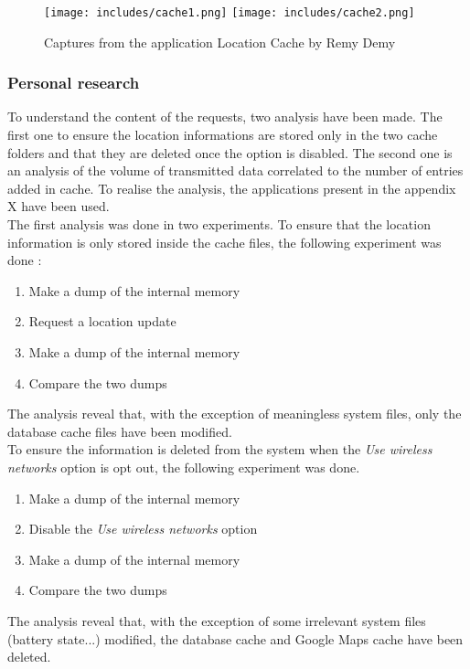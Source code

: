 \documentclass{report}
\begin{document}
\begin{figure}[h]
  \centering
  \texttt{[image: includes/cache1.png]}
  \texttt{[image: includes/cache2.png]}
  \caption{Captures from the application Location Cache by Remy Demy}
  \label{fig:locmap}
\end{figure}


\subsubsection{Personal research}

To understand the content of the requests, two analysis have been made. The first one to ensure the location informations are stored only in the two cache folders and that they are deleted once the option is disabled. The second one is an analysis of the volume of transmitted data correlated to the number of entries added in cache. To realise the analysis, the applications present in the appendix X have been used.\\

The first analysis was done in two experiments. To ensure that the location information is only stored inside the cache files, the following experiment was done :
\begin{enumerate}
\item Make a dump of the internal memory
\item Request a location update
\item Make a dump of the internal memory
\item Compare the two dumps
\end{enumerate}

The analysis reveal that, with the exception of meaningless system files, only the database cache files have been modified.\\

To ensure the information is deleted from the system when the \emph{Use wireless networks} option is opt out, the following experiment was done.

\begin{enumerate}
\item Make a dump of the internal memory
\item Disable the \emph{Use wireless networks} option
\item Make a dump of the internal memory
\item Compare the two dumps
\end{enumerate}

The analysis reveal that, with the exception of some irrelevant system files (battery state...) modified, the database cache and Google Maps cache have been deleted.\\
\end{document}
